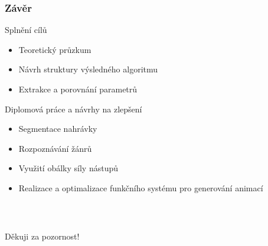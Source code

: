 \documentclass[%
  12pt,       				%
	t,                  %
	aspectratio=1610,   %
	unicode,						%
]{beamer}				    	%
\begin{document}

\begin{frame} 
	\frametitle{Závěr}
	\begin{block}{Splnění cílů}
		\begin{itemize}
			\item Teoretický průzkum
			\item Návrh struktury výsledného algoritmu
			\item Extrakce a porovnání parametrů
		\end{itemize}
	\end{block}
	\begin{block}{Diplomová práce a návrhy na zlepšení}
		\begin{itemize}
			\item Segmentace nahrávky
			\item Rozpoznávání žánrů
			\item Využití obálky síly nástupů
			\item Realizace a optimalizace funkčního systému pro generování animací
		\end{itemize}
	\end{block}
\end{frame}

\begin{frame}[c] 
	\frametitle{\mbox{ }}
	\begin{center}
		{\Huge Děkuji za pozornost!}
	\end{center}
\end{frame}
\end{document}
